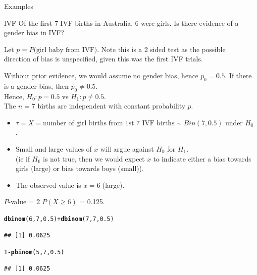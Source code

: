 \documentclass[t,xcolor=pdftex,dvipsnames,table]{beamer}\usepackage[]{graphicx}\usepackage[]{color}
\makeatletter
\newcommand{\hlnum}[1]{\textcolor[rgb]{0.686,0.059,0.569}{#1}}%
\newcommand{\hlopt}[1]{\textcolor[rgb]{0,0,0}{#1}}%
\newcommand{\hlstd}[1]{\textcolor[rgb]{0.345,0.345,0.345}{#1}}%
\newcommand{\hlkwd}[1]{\textcolor[rgb]{0.737,0.353,0.396}{\textbf{#1}}}%
\newenvironment{kframe}{%
 \def\at@end@of@kframe{}%
 \ifinner\ifhmode%
  \def\at@end@of@kframe{\end{minipage}}%
  \begin{minipage}{\columnwidth}%
 \fi\fi%
 \def\FrameCommand##1{\hskip\@totalleftmargin \hskip-\fboxsep
 \colorbox{shadecolor}{##1}\hskip-\fboxsep
     \hskip-\linewidth \hskip-\@totalleftmargin \hskip\columnwidth}%
 \MakeFramed {\advance\hsize-\width
   \@totalleftmargin\z@ \linewidth\hsize
   \@setminipage}}%
 {\par\unskip\endMakeFramed%
 \at@end@of@kframe}
\newenvironment{knitrout}{}{} %
\makeatother
\begin{document}
\begin{frame}{Examples}
\begin{block}{IVF}
Of the first 7 IVF births in Australia, 6 were girls. Is there evidence of a gender bias in IVF?
\end{block}

\vspace{.5cm}
Let $p = P(\mbox{girl baby from IVF)}$. Note this is a 2 sided test as the possible direction of bias is unspecified, given this was the first IVF trials.

\vspace{.5cm}
Without prior evidence, we would assume no gender bias, hence $p_{0} = 0.5$. If there is a gender bias, then $p_{0} \neq 0.5$.  \\
Hence,  $H_{0}: p = 0.5$ vs $H_{1}: p \neq 0.5$. \\

\vspace{.5cm}
 The $n=7$ births are independent with constant probability $p$.

\end{frame}


\begin{frame}[fragile]{}

\begin{itemize}
\item $\tau = X =  \mbox{number of girl births from 1st 7 IVF births} \sim Bin(7,0.5)$ under $H_{0}$. 
\item Small and large values of $x$ will argue against $H_{0}$ for $H_{1}$. \\
(ie if $H_{0}$ is not true, then we would expect $x$ to indicate either a bias towards girls (large) or bias towards boys (small)).
\item The observed value is $x=6$ (large).
\end{itemize}

\vspace{.5cm}
 $P$-value = 2 $P( X \geq 6)$ = 0.125.

\begin{knitrout}
\color{fgcolor}\begin{kframe}
\begin{alltt}
\hlkwd{dbinom}\hlstd{(}\hlnum{6}\hlstd{,}\hlnum{7}\hlstd{,}\hlnum{0.5}\hlstd{)} \hlopt{+} \hlkwd{dbinom}\hlstd{(}\hlnum{7}\hlstd{,}\hlnum{7}\hlstd{,}\hlnum{0.5}\hlstd{)}
\end{alltt}
\begin{verbatim}
## [1] 0.0625
\end{verbatim}
\begin{alltt}
\hlnum{1}\hlopt{-}\hlkwd{pbinom}\hlstd{(}\hlnum{5}\hlstd{,}\hlnum{7}\hlstd{,}\hlnum{0.5}\hlstd{)}
\end{alltt}
\begin{verbatim}
## [1] 0.0625
\end{verbatim}
\end{kframe}
\end{knitrout}
\end{frame}
\end{document}
